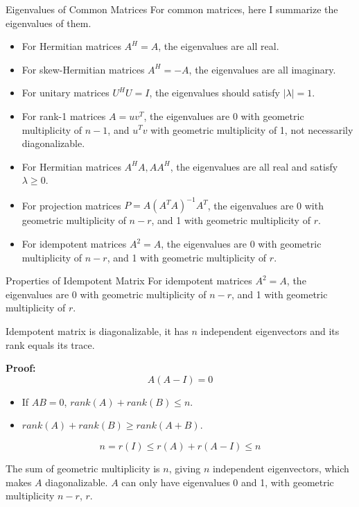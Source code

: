 \documentclass{beamer}
\begin{document}
\begin{frame}{Eigenvalues of Common Matrices}
For common matrices, here I summarize the eigenvalues of them.
\begin{itemize}
    \item For Hermitian matrices $A^H=A$, the eigenvalues are all real.
    \item For skew-Hermitian matrices $A^H=-A$, the eigenvalues are all imaginary.
    \item For unitary matrices $U^HU=I$, the eigenvalues should satisfy $|\lambda|=1$.
    \item For rank-1 matrices $A=uv^T$, the eigenvalues are 0 with geometric multiplicity of $n-1$, and $u^Tv$ with geometric multiplicity of 1, not necessarily diagonalizable.
    \item For Hermitian matrices $A^HA, AA^H$, the eigenvalues are all real and satisfy $\lambda \geq 0$.
    \item For projection matrices $P=A(A^TA)^{-1}A^T$, the eigenvalues are 0 with geometric multiplicity of $n-r$, and 1 with geometric multiplicity of $r$.
    \item For idempotent matrices $A^2=A$, the eigenvalues are 0 with geometric multiplicity of $n-r$, and 1 with geometric multiplicity of $r$.
\end{itemize}
\end{frame}

\begin{frame}{Properties of Idempotent Matrix}
For idempotent matrices $A^2=A$, the eigenvalues are 0 with geometric multiplicity of $n-r$, and 1 with geometric multiplicity of $r$.

\vspace{3pt}
Idempotent matrix is diagonalizable, it has $n$ independent eigenvectors and its rank equals its trace.

\vspace{5pt}

\textbf{Proof:}
\begin{equation*}
    A\left( A-I \right) =0
\end{equation*}

\begin{itemize}
    \item If $AB=0$, $rank(A)+rank(B)\leq n$.
    \item $rank(A)+rank(B)\geq  rank(A+B)$.
\end{itemize}

\begin{equation*}
    n=r\left( I \right) \leqslant r\left( A \right) +r\left( A-I \right) \leqslant n
\end{equation*}

The sum of geometric multiplicity is $n$, giving $n$ independent eigenvectors, which makes $A$ diagonalizable. $A$ can only have eigenvalues 0 and 1, with geometric multiplicity $n-r$, $r$.
\end{frame}
\end{document}
